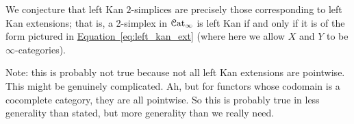 \documentclass[main.tex]{subfiles}
\begin{document}
We conjecture that left Kan $2$-simplices are precisely those corresponding to left Kan extensions; that is, a 2-simplex in $\mathcal{C}\mathrm{at}_{\infty}$ is left Kan if and only if it is of the form pictured in \hyperref[eq:left_kan_ext]{Equation~\ref*{eq:left_kan_ext}} (where here we allow $X$ and $Y$ to be $\infty$-categories).

Note: this is probably not true because not all left Kan extensions are pointwise. This might be genuinely complicated. Ah, but for functors whose codomain is a cocomplete category, they are all pointwise. So this is probably true in less generality than stated, but more generality than we really need.
\end{document}
